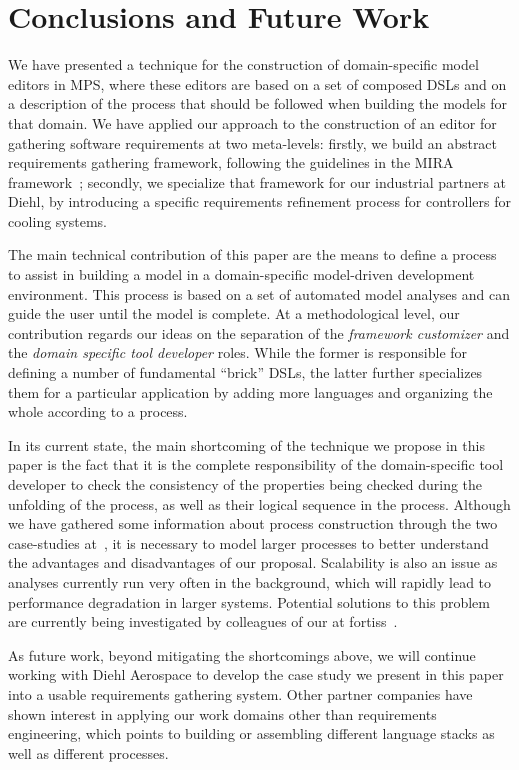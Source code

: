 \section{Conclusions and Future Work}
\label{sec:conclusion}
 \vspace{-.4cm}
We have presented a technique for the construction of
domain-specific model editors in MPS, where these editors are based on
a set of composed DSLs and on a description of the process that
should be followed when building the models for that domain. We have applied our
approach to the construction of an editor for gathering software requirements
at two meta-levels: firstly, we build an abstract requirements gathering
framework, following the guidelines in the MIRA framework~\cite{MIRA13}; secondly, we
specialize that framework for our industrial partners at Diehl, by introducing
a specific requirements refinement process for controllers for cooling systems.

The main technical contribution of this paper are the means to define a process
to assist in building a model in a domain-specific model-driven development
environment. This process is based on a set of automated model analyses and can
guide the user until the model is complete.
At a methodological level, our contribution regards our ideas on the separation
of the \emph{framework customizer} and the  \emph{domain specific tool
developer} roles. While the former is responsible for defining a number of
fundamental ``brick'' DSLs, the latter further specializes them for a particular
application by adding more languages and organizing the whole according to a
process.

In its current state, the main shortcoming of the technique we propose in this
paper is the fact that it is the complete responsibility of the domain-specific
tool developer to check the consistency of the properties being checked during
the unfolding of the process, as well as their logical sequence in the process.
Although we have gathered some information about process construction through
the two case-studies
at~\cite{coolingControllerProcessVideo,earsctrlProcessVideo}, it is necessary to
model larger processes to better understand the advantages and disadvantages of
our proposal.  Scalability is also an issue as analyses currently
run very often in the background, which will rapidly lead to performance
degradation in larger systems. Potential solutions to this problem are currently
being investigated by colleagues of our at fortiss~\cite{Models17Sudeep}.

As future work, beyond mitigating the shortcomings above, we will continue
working with Diehl Aerospace to develop the case study we present in this paper
into a usable requirements gathering system. Other partner companies have shown
interest in applying our work domains other than requirements engineering, which
points to building or assembling different language stacks as well as different
processes.
 \vspace{-.6cm}
